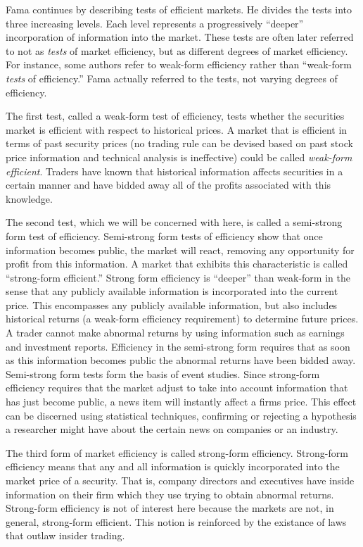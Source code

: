 Fama continues by describing tests of efficient markets.  He
divides
the tests into three increasing levels.  Each level represents a
progressively ``deeper'' incorporation of information into the
market.
These tests are often later referred to not as {\em tests}
of market efficiency, but as different degrees of market
efficiency.  For instance, some authors refer to
weak-form efficiency rather than ``weak-form {\em tests} of
efficiency.''
Fama actually referred to the tests, not varying degrees of
efficiency.

The first test, called a weak-form test of efficiency, tests
whether the securities market is efficient with respect to
historical prices.  A market that is efficient in terms of past
security prices (no trading rule can be devised based on
past stock price information and technical analysis is
ineffective) could be called {\em weak-form efficient}.
Traders have known that historical information affects
securities in a certain manner and have bidded away all of the
profits
associated with this knowledge.

The second test, which we will be concerned with here, is
called a semi-strong form test of efficiency.  Semi-strong
form tests of efficiency show that once information becomes
public, the market will react, removing any opportunity for
profit from this information.  A market that exhibits this
characteristic is called ``strong-form efficient.''  Strong
form efficiency  is ``deeper'' than
weak-form in the sense that any publicly available information is 
incorporated into the current price.  This encompasses any
publicly available information, but also includes historical
returns (a weak-form efficiency requirement) to determine future
prices.  
A trader cannot make abnormal returns by
using information such as earnings and investment reports. 
Efficiency
in the semi-strong form requires that as soon as this information
becomes public the abnormal returns have been bidded away. 
Semi-strong form tests form the basis of event studies.  
Since strong-form efficiency requires that the market adjust
to take into account information that has just become
public, a news item will instantly affect a firms price. 
This effect can be discerned using statistical techniques,
confirming or rejecting a hypothesis a researcher might have
about the certain news on companies or an industry.

The third form of market efficiency is called strong-form
efficiency.
Strong-form efficiency means that any and all information is
quickly
incorporated into the market price of a security.  That is, company
directors and executives have inside information on their firm
which
they use trying to obtain abnormal returns.  Strong-form efficiency
is
not of interest here because the markets are not, in general,
strong-form efficient.  This notion is reinforced by the
existance of laws that outlaw insider trading.

